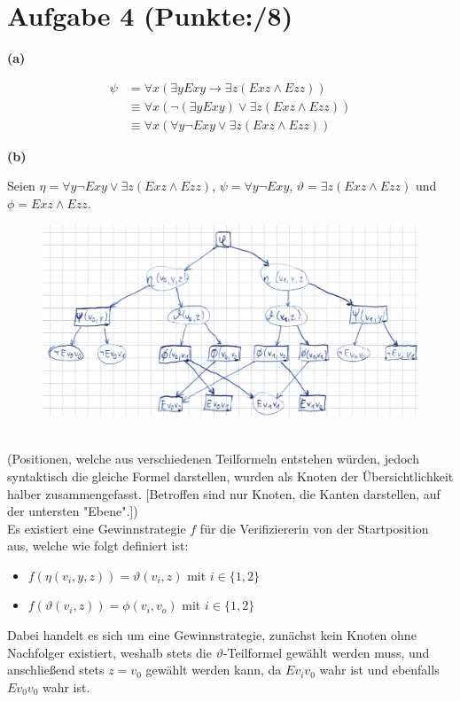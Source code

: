 \documentclass[11pt, a4paper]{article}
\newcommand{\ppp}{8}
\begin{document}
\section*{Aufgabe 4 (Punkte:\qquad/\ppp)}
\textbf{(a)}
\begin{adjustwidth}{20pt}{20pt}\vspace{-\baselineskip}
\begin{align*}
\psi &= \forall x(\exists yExy \rightarrow \exists z(Exz \wedge Ezz)) \\
	&\equiv \forall x(\neg(\exists yExy) \vee \exists z(Exz \wedge Ezz)) \\
	&\equiv \forall x(\forall y\neg Exy \vee \exists z(Exz \wedge Ezz))
\end{align*}
\end{adjustwidth}
\textbf{(b)}
\begin{adjustwidth}{20pt}{20pt}
Seien $\eta = \forall y\neg Exy \vee \exists z(Exz \wedge Ezz)$, $\psi = \forall y\neg Exy$, $\vartheta = \exists z(Exz \wedge Ezz)$ und $\phi = Exz \wedge Ezz$.
\begin{figure}[h]
\centering
\includegraphics{4b.png}
\end{figure}\\
(Positionen, welche aus verschiedenen Teilformeln entstehen würden, jedoch syntaktisch die gleiche Formel darstellen, wurden als Knoten der Übersichtlichkeit halber zusammengefasst.
[Betroffen sind nur Knoten, die Kanten darstellen, auf der untersten "Ebene".])\\
Es existiert eine Gewinnstrategie $f$ für die Verifiziererin von der Startposition aus, welche wie folgt definiert ist:
\begin{itemize}
\item $f(\eta(v_i,y,z))=\vartheta(v_i,z)$ mit $i \in \{ 1,2\}$
\item $f(\vartheta(v_i,z))= \phi(v_i,v_o)$ mit $i \in \{ 1,2\}$
\end{itemize}
Dabei handelt es sich um eine Gewinnstrategie, zunächst kein Knoten ohne Nachfolger existiert, weshalb stets die $\vartheta$-Teilformel gewählt werden muss, und anschließend stets
$z=v_0$ gewählt werden kann, da $Ev_iv_0$ wahr ist und ebenfalls $Ev_0v_0$ wahr ist. 
\end{adjustwidth}
\end{document}
